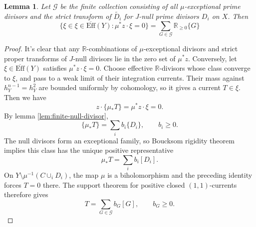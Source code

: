 \documentclass[reqno]{amsart}
\theoremstyle{remark}
\def\R{\mathbb{R}}
\newcommand{\Eff}{\text{Eff}}
\def\cG{{\mathcal G}}
\theoremstyle{plain}
\newtheorem{lemma}[thm]{Lemma}
\begin{document}
\begin{lemma}\label{lem:finite-generated-null-blowup}Let $\cG$ be the finite collection consisting of all $\mu$-exceptional prime divisors and the strict transform of $\tilde{D_i}$ for J-null prime divisors $D_i$ on $X$. Then \[
\{\xi\in \xi\in\overline{\Eff}(Y):\mu^*z\cdot\xi=0\}=\sum_{G\in \cG}\R_{\ge 0}\{G\}
\]
\end{lemma}
\begin{proof}  It's clear that any $\R$-combinations of $\mu$-exceptional divisors and strict proper transforms of $J$-null divisors lie in the zero set of $\mu^*z$. 
Conversely, let $\xi\in \overline{\Eff}(Y)$ satisfies $\mu^*z\cdot \xi=0$. Choose effective $\R$-divisors whose class converge to $\xi$, and pass to a weak limit of their integration currents. Their mass against $h_Y^{n-1}=h_Y^2$ are bounded uniformly by cohomology, so it gives a current $T\in \xi$. Then we have \[
z\cdot \{\mu_*T\}=\mu^*z\cdot \xi=0.
\]
By lemma \ref{lem:finite-null-divisor}, \[
\{\mu_*T\}=\sum_ib_i\{D_i\}, \qquad b_i\geq 0.
\]
The null divisors form an exceptional family, so Boucksom rigidity theorem \cite[Proposition 3.13]{B04} implies this class has the unique positive representative \[
\mu_*T=\sum_ib_i[D_i].
\]
On $Y\setminus \mu^{-1}(C\cup_iD_i)$, the map $\mu$ is a biholomorphism and the preceding identity forces $T=0$ there. The support theorem for positive closed $(1,1)$-currents therefore gives \[
T=\sum_{G\in \cG}b_G[G], \qquad b_G\geq 0.
\]

\end{proof}
\end{document}
